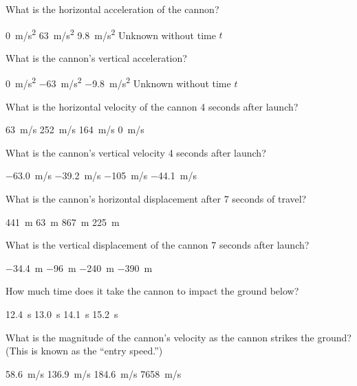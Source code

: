 \documentclass{exam}
\begin{document}
\begin{questions}
\question
What is the horizontal acceleration of the cannon?

\begin{choices}
    \correctchoice \SI{0}{m/s^2}
    \choice \SI{63}{m/s^2}
    \choice \SI{9.8}{m/s^2}
    \choice Unknown without time $t$
\end{choices}

\question
What is the cannon's vertical acceleration?

\begin{choices}
    \choice \SI{0}{m/s^2}
    \choice \SI{-63}{m/s^2}
    \correctchoice \SI{-9.8}{m/s^2}
    \choice Unknown without time $t$
\end{choices}

\clearpage
\question
What is the horizontal velocity of the cannon 4 seconds after launch?

\begin{choices}
    \correctchoice \SI{63}{m/s}
    \choice \SI{252}{m/s}
    \choice \SI{164}{m/s}
    \choice \SI{0}{m/s}
\end{choices}

\question 
What is the cannon's vertical velocity 4 seconds after launch?

\begin{choices}
    \choice \SI{-63.0}{m/s}
    \correctchoice \SI{-39.2}{m/s}
    \choice \SI{-105}{m/s}
    \choice \SI{-44.1}{m/s}
\end{choices}

\question
What is the cannon's horizontal displacement after 7 seconds of travel?

\begin{choices}
    \correctchoice \SI{441}{m}
    \choice \SI{63}{m}
    \choice \SI{867}{m}
    \choice \SI{225}{m}
\end{choices}

\question
What is the vertical displacement of the cannon 7 seconds after launch?

\begin{choices}
    \choice \SI{-34.4}{m}
    \choice \SI{-96}{m}
    \correctchoice \SI{-240}{m}
    \choice \SI{-390}{m}
\end{choices}


\question
How much time does it take the cannon to impact the ground below?

\begin{choices}
    \correctchoice \SI{12.4}{s}
    \choice \SI{13.0}{s}
    \choice \SI{14.1}{s}
    \choice \SI{15.2}{s}
\end{choices}

\question
What is the magnitude of the cannon's velocity as the cannon strikes the ground? (This is known as the ``entry speed.'')

\begin{choices}
    \choice \SI{58.6}{m/s}
    \correctchoice \SI{136.9}{m/s}
    \choice \SI{184.6}{m/s}
    \choice \SI{7658}{m/s}
\end{choices}

\end{questions}
\end{document}
